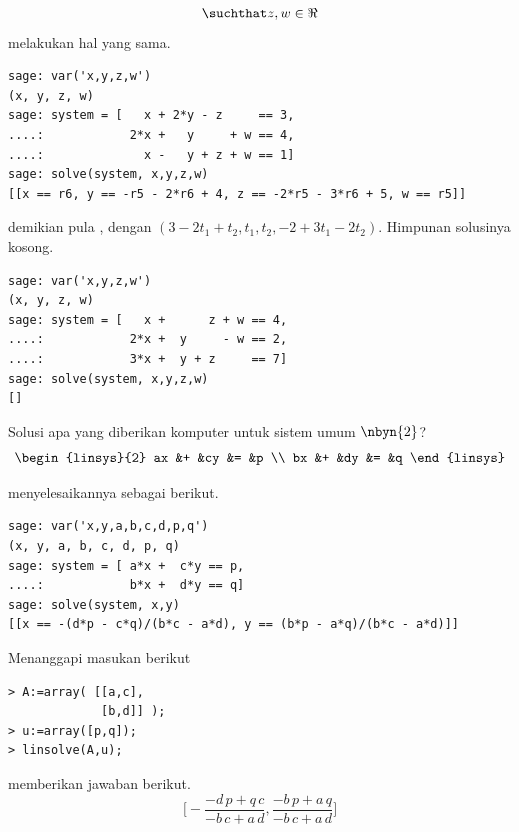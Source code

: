 \begin{exercises}
\begin{answer}
\begin{exparts}
\begin{equation*}
{                  \suchthat z,w\in\Re}
           \end{equation*}
           \Sage{} melakukan hal yang sama.
\begin{lstlisting}
sage: var('x,y,z,w')
(x, y, z, w)
sage: system = [   x + 2*y - z     == 3,
....:            2*x +   y     + w == 4,
....:              x -   y + z + w == 1]
sage: solve(system, x,y,z,w)
[[x == r6, y == -r5 - 2*r6 + 4, z == -2*r5 - 3*r6 + 5, w == r5]]             
\end{lstlisting}
           demikian pula \Maple{}, dengan $(3-2t_1+t_2,t_1,t_2,-2+3t_1-2t_2)$.
        \partsitem Himpunan solusinya kosong.
\begin{lstlisting}
sage: var('x,y,z,w')
(x, y, z, w)
sage: system = [   x +      z + w == 4,
....:            2*x +  y     - w == 2,
....:            3*x +  y + z     == 7]
sage: solve(system, x,y,z,w)
[]          
\end{lstlisting}
      \end{exparts}
    \end{answer}
  \item 
    Solusi apa yang diberikan komputer untuk sistem umum
    $\nbyn{2}$?
    \begin{equation*}
      \begin{linsys}{2}
        ax  &+  &cy  &=  &p  \\
        bx  &+  &dy  &=  &q
      \end{linsys}
    \end{equation*}
    \begin{answer}
      \Sage{} menyelesaikannya sebagai berikut.
\begin{lstlisting}
sage: var('x,y,a,b,c,d,p,q')
(x, y, a, b, c, d, p, q)
sage: system = [ a*x +  c*y == p,
....:            b*x +  d*y == q]
sage: solve(system, x,y)
[[x == -(d*p - c*q)/(b*c - a*d), y == (b*p - a*q)/(b*c - a*d)]]        
\end{lstlisting}
       Menanggapi masukan berikut
\begin{lstlisting}
> A:=array( [[a,c],
             [b,d]] );
> u:=array([p,q]);
> linsolve(A,u);
\end{lstlisting}
      \Maple{} memberikan jawaban berikut.
      \begin{equation*}
        \bigl[-\frac{-d\,p+q\,c}{-b\,c+a\,d},
          \frac{-b\,p+a\,q}{-b\,c+a\,d}\bigr]
      \end{equation*}
    \end{answer}
\end{exercises}
\endinput
